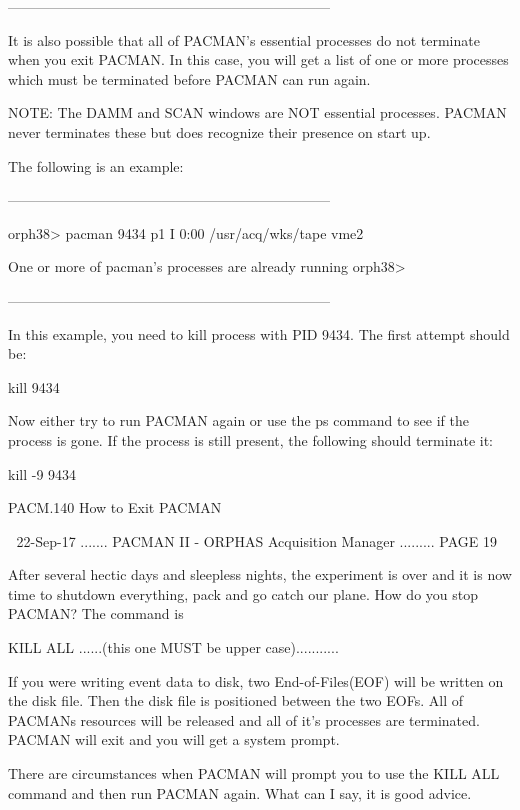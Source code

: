      ---------------------------------------------------------------------
 
   It  is  also  possible  that  all  of  PACMAN's  essential processes do not
   terminate when you exit PACMAN.  In this case, you will get a  list  of one
   or more processes which must be terminated before PACMAN can run again.
 
     NOTE:  The  DAMM  and   SCAN  windows are NOT essential processes. PACMAN
          never terminates these but does recognize their  presence  on  start
          up.
 
   The following is an example:
 
     ---------------------------------------------------------------------
 
   orph38> pacman
    9434 p1 I      0:00 /usr/acq/wks/tape vme2
 
   One or more of pacman's processes are already running
   orph38>
 
     ---------------------------------------------------------------------
 
   In this example, you need to kill process with PID 9434.  The first attempt
   should be:
 
          kill 9434
 
   Now  either  try  to  run  PACMAN again or use the ps command to see if the
   process is gone.  If the process is  still  present,  the  following should
   terminate it:
 
          kill -9 9434
 
 
   PACM.140 How to Exit PACMAN
 
    
   22-Sep-17 ....... PACMAN II - ORPHAS Acquisition Manager ......... PAGE  19
 
   After  several  hectic  days  and sleepless nights,  the experiment is over
   and it is now time to shutdown everything, pack and  go  catch  our  plane.
   How do you stop PACMAN?  The command is
 
   KILL ALL ......(this one MUST be upper case)...........
 
   If  you  were  writing  event  data  to disk, two End-of-Files(EOF) will be
   written on the disk file. Then the disk file is positioned between the  two
   EOFs.  All  of PACMANs resources will be released and all of it's processes
   are terminated. PACMAN will exit and you will get a system prompt.
 
   There are circumstances when PACMAN will prompt you to  use  the  KILL  ALL
   command and then run PACMAN again.  What can I say, it is good advice.
 
